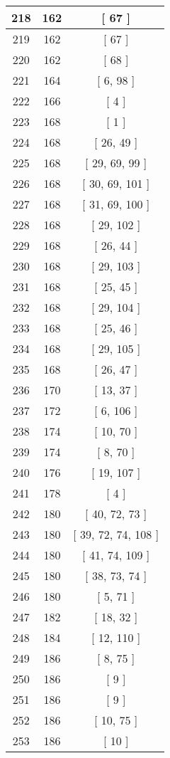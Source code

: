 \begin{center}
\begin{longtable}[H]{|| c c c ||}
\hline
218 & 162 & [ 67 ] \\ 
\hline
219 & 162 & [ 67 ] \\ 
\hline
220 & 162 & [ 68 ] \\ 
\hline
221 & 164 & [ 6, 98 ] \\ 
\hline
222 & 166 & [ 4 ] \\ 
\hline
223 & 168 & [ 1 ] \\ 
\hline
224 & 168 & [ 26, 49 ] \\ 
\hline
225 & 168 & [ 29, 69, 99 ] \\ 
\hline
226 & 168 & [ 30, 69, 101 ] \\ 
\hline
227 & 168 & [ 31, 69, 100 ] \\ 
\hline
228 & 168 & [ 29, 102 ] \\ 
\hline
229 & 168 & [ 26, 44 ] \\ 
\hline
230 & 168 & [ 29, 103 ] \\ 
\hline
231 & 168 & [ 25, 45 ] \\ 
\hline
232 & 168 & [ 29, 104 ] \\ 
\hline
233 & 168 & [ 25, 46 ] \\ 
\hline
234 & 168 & [ 29, 105 ] \\ 
\hline
235 & 168 & [ 26, 47 ] \\ 
\hline
236 & 170 & [ 13, 37 ] \\ 
\hline
237 & 172 & [ 6, 106 ] \\ 
\hline
238 & 174 & [ 10, 70 ] \\ 
\hline
239 & 174 & [ 8, 70 ] \\ 
\hline
240 & 176 & [ 19, 107 ] \\ 
\hline
241 & 178 & [ 4 ] \\ 
\hline
242 & 180 & [ 40, 72, 73 ] \\ 
\hline
243 & 180 & [ 39, 72, 74, 108 ] \\ 
\hline
244 & 180 & [ 41, 74, 109 ] \\ 
\hline
245 & 180 & [ 38, 73, 74 ] \\ 
\hline
246 & 180 & [ 5, 71 ] \\ 
\hline
247 & 182 & [ 18, 32 ] \\ 
\hline
248 & 184 & [ 12, 110 ] \\ 
\hline
249 & 186 & [ 8, 75 ] \\ 
\hline
250 & 186 & [ 9 ] \\ 
\hline
251 & 186 & [ 9 ] \\ 
\hline
252 & 186 & [ 10, 75 ] \\ 
\hline
253 & 186 & [ 10 ] \\ 

\end{longtable}
\end{center}

